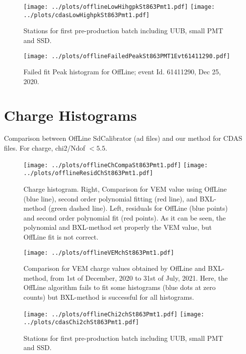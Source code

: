 \documentclass[twoside, final, 10pt]{articleMine}
\begin{document}
\begin{figure}[!tbh]
  \centering
  \subfigure
  {
    \texttt{[image: ../plots/offlineLowHihgpkSt863Pmt1.pdf]}
    \texttt{[image: ../plots/cdasLowHighpkSt863Pmt1.pdf]}
  }
  \caption{Stations for first pre-production batch including UUB, small PMT and SSD.}
  \label{figPkLowHigh}
\end{figure}


\begin{figure}[!tbh]
  \centering
  \subfigure
  {
    \texttt{[image: ../plots/offlineFailedPeakSt863PMT1Evt61411290.pdf]}
  }
  \caption{Failed fit Peak histogram for OffLine; event Id. 61411290, Dec 25, 2020.}
  \label{figPkFailsfit}
\end{figure}
\clearpage

\section*{Charge Histograms}
Comparison between OffLine SdCalibrator (ad files) and our method
for CDAS files. For charge, chi2/Ndof $<5.5$.
\clearpage

\begin{figure}[!tbh]
  \centering
  \subfigure
  {
    \texttt{[image: ../plots/offlineChCompaSt863Pmt1.pdf]}
    \texttt{[image: ../plots/offlineResidChSt863Pmt1.pdf]}
  }
  \caption{Charge histogram. Right, Comparison for VEM value
  using OffLine (blue line), second order polynomial fitting (red
  line), and BXL-method (green dashed line). Left, residuals for
  OffLine (blue points) and second order polynomial fit (red
  points). As it can be seen, the polynomial and BXL-method set
  properly the VEM value, but OffLine fit is not correct.}
  \label{figChCompaOffFitDer}
\end{figure}

\begin{figure}[!tbh]
  \centering
  \subfigure
  {
    \texttt{[image: ../plots/offlineVEMchSt863Pmt1.pdf]}
  }
  \caption{Comparison for VEM charge values obtained by OffLine
  and BXL-method, from 1st of December, 2020 to 31st of July,
  2021. Here, the OffLine algorithm fails to fit some histograms
  (blue dots at zero counts) but BXL-method is successful for all
  histograms.}
  \label{figChCompVemOffBxl}
\end{figure}
\clearpage

\begin{figure}[!tbh]
  \centering
  \subfigure
  {
    \texttt{[image: ../plots/offlineChi2chSt863Pmt1.pdf]}
    \texttt{[image: ../plots/cdasChi2chSt863Pmt1.pdf]}
  }
  \caption{Stations for first pre-production batch including UUB, small PMT and SSD.}
  \label{figChChi2serie}
\end{figure}
\end{document}
